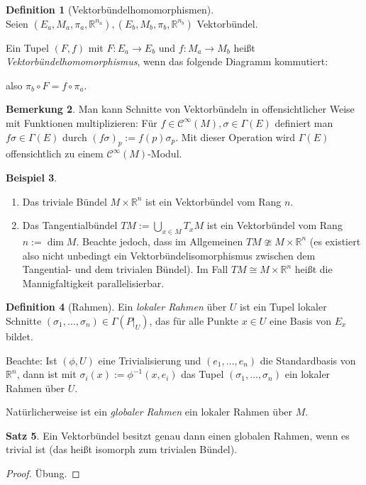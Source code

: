 \documentclass[a4paper]{scrreprt}
\numberwithin{equation}{chapter}
\newcommand{\R}{\mathbb{R}}
\newcommand{\sC}{\mathcal{C}^{\infty}}
\theoremstyle{definition}
\newtheorem{defn}{Definition}[section]
\newtheorem{satz}[defn]{Satz}
\newtheorem{bem}[defn]{Bemerkung}
\newtheorem{bsp}[defn]{Beispiel}
\newcommand{\bewUeb}{\begin{proof}Übung.\end{proof}}
\begin{document}
		\begin{defn}[Vektorbündelhomomorphismen]\hfill\\
			Seien $(E_a,M_a,\pi_a,\R^{n_a}),(E_b,M_b,\pi_b,\R^{n_b})$ Vektorbündel.
			
			Ein Tupel $(F,f)$ mit $F\colon E_a\rightarrow E_b$ und $f\colon M_a\rightarrow M_b$ heißt \emph{Vektorbündelhomomorphismus}, wenn das folgende Diagramm kommutiert:
			\begin{center}
			\end{center}
			also $\pi_b\circ F=f\circ\pi_a$.
		\end{defn}
		
		
		\begin{bem}
			Man kann Schnitte von Vektorbündeln in offensichtlicher Weise mit Funktionen multiplizieren: Für $f \in \sC(M), \sigma \in \Gamma(E)$ definiert man $f\sigma \in \Gamma(E)$ durch $(f\sigma)_p := f(p) \sigma_p$. Mit dieser Operation wird $\Gamma(E)$ offensichtlich zu einem $\sC(M)$-Modul.
		\end{bem}

		
		\begin{bsp}\hfill
			\begin{enumerate}
				\item Das triviale Bündel $M\times \R^n$ ist ein Vektorbündel vom Rang $n$.
				\item Das Tangentialbündel $TM:=\bigcup_{x\in M}T_xM$ ist ein Vektorbündel vom Rang $n:=\dim M$. Beachte jedoch, dass im Allgemeinen $TM\ncong M\times \R^n$ (es existiert also nicht unbedingt ein Vektorbündelisomorphismus zwischen dem Tangential- und dem trivialen Bündel). Im Fall $TM\cong M\times \R^n$ heißt die Mannigfaltigkeit parallelisierbar.
			\end{enumerate}
		\end{bsp}
		\begin{defn}[Rahmen]
			Ein \emph{lokaler Rahmen} über $U$ ist ein Tupel lokaler Schnitte $(\sigma_1,\ldots,\sigma_n)\in\Gamma(P\vert_U)$, das für alle Punkte $x\in U$ eine Basis von $E_x$ bildet. 
			
			Beachte: Ist $(\phi,U)$ eine Trivialisierung und $(e_1,\ldots,e_n)$ die Standardbasis von $\R^n$, dann ist mit $\sigma_i(x):=\phi^{-1}(x,e_i)$ das Tupel $(\sigma_1,\ldots,\sigma_n)$ ein lokaler Rahmen über $U$.
			
			Natürlicherweise ist ein \emph{globaler Rahmen} ein lokaler Rahmen über $M$.
		\end{defn}
		\begin{satz}
			Ein Vektorbündel besitzt genau dann einen globalen Rahmen, wenn es trivial ist (das heißt isomorph zum trivialen Bündel).
			\bewUeb
		\end{satz}
		
\end{document}
